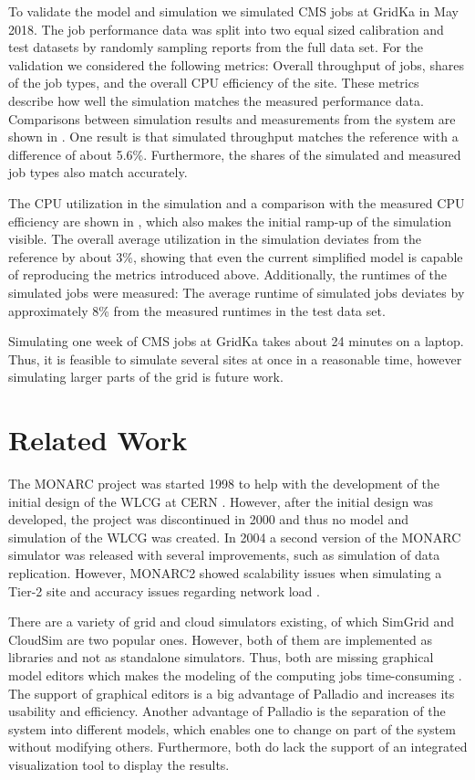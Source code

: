 \documentclass{webofc}
\begin{document}
\vspace{10px}
\noindent To validate the model and simulation we simulated CMS jobs at GridKa in May 2018.
The job performance data was split into two equal sized calibration and test datasets by randomly sampling reports from the full data set.
For the validation we considered the following metrics: Overall throughput of jobs, shares of the job types, and the overall CPU efficiency of the site.
These metrics describe how well the simulation matches the measured performance data.
Comparisons between simulation results and measurements from the system are shown in .
One result is that simulated throughput matches the reference with a difference of about 5.6\%.
Furthermore, the shares of the simulated and measured job types also match accurately.

The CPU utilization in the simulation and a comparison with the measured CPU efficiency are shown in , which also makes the initial ramp-up of the simulation visible.
The overall average utilization in the simulation deviates from the reference by about 3\%, showing that even the current simplified model is capable of reproducing the metrics introduced above.
Additionally, the runtimes of the simulated jobs were measured: The average runtime of simulated jobs deviates by approximately 8\% from the measured runtimes in the test data set.

Simulating one week of CMS jobs at GridKa takes about 24 minutes on a laptop.
Thus, it is feasible to simulate several sites at once in a reasonable time, however simulating larger parts of the grid is future work.

\section{Related Work}
\label{related}
The MONARC project was started 1998 to help with the development of the initial design of the WLCG at CERN \cite{monarc2000models}.
However, after the initial design was developed, the project was discontinued in 2000 and thus no model and simulation of the WLCG was created. 
In 2004 a second version of the MONARC simulator was released with several improvements, such as simulation of data replication. However, MONARC2 showed scalability issues when simulating a Tier-2 site and accuracy issues regarding network load \cite{1742-6596-331-7-072038}.

There are a variety of grid and cloud simulators existing, of which SimGrid and CloudSim are two popular ones. 
However, both of them are implemented as libraries and not as standalone simulators. Thus, both are missing graphical model editors which makes the modeling of the computing jobs time-consuming \cite{simgrid,cloudsim}. The support of graphical editors is a big advantage of Palladio and increases its usability and efficiency. Another advantage of Palladio is the separation of the system into different models, which enables one to change on part of the system without modifying others. Furthermore, both do lack the support of an integrated visualization tool to display the results.  
\end{document}
